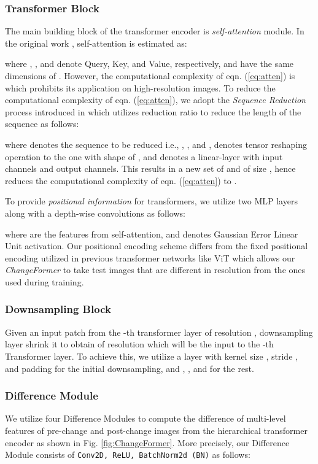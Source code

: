 \documentclass{article}
\def\ChangeFormer{{\textit{ChangeFormer}}}
\begin{document}
\subsubsection{Transformer Block} 
The main building block of the transformer encoder is \textit{self-attention} module. In the original work \cite{original_attention}, self-attention is estimated as:

where , , and  denote Query, Key, and Value, respectively, and have the same dimensions of . However, the computational complexity of eqn. (\ref{eq:atten}) is  which prohibits its application on high-resolution images. To reduce the computational complexity of eqn. (\ref{eq:atten}), we adopt the \textit{Sequence Reduction} process introduced in \cite{eff_atten} which utilizes reduction ratio  to reduce the length of the sequence  as follows:


where  denotes the sequence to be reduced i.e., , , and ,   denotes tensor reshaping operation to the one with
shape of ,  and  denotes a linear-layer with  input channels and  output channels. This results in a new set of  and  of size , hence reduces the computational complexity of eqn. (\ref{eq:atten}) to .

To provide \textit{positional information} for transformers, we utilize two MLP layers along with a  depth-wise convolutions as follows:

where  are the features from self-attention, and  denotes Gaussian Error Linear Unit activation. Our positional encoding scheme differs from the fixed positional encoding utilized in previous transformer networks like ViT \cite{vit} which allows our \ChangeFormer{} to take test images that are different in resolution from the ones used during training.


\subsubsection{Downsampling Block} 
Given an input patch  from the -th transformer layer of resolution , downsampling layer shrink it to obtain  of resolution  which will be the input to the -th Transformer layer. To achieve this, we utilize a   layer with  kernel size , stride , and padding  for the initial downsampling, and  , , and  for the rest.

\subsubsection{Difference Module} 
We utilize four Difference Modules to compute the difference of multi-level features of pre-change and post-change images from the hierarchical transformer encoder as shown in Fig. \ref{fig:ChangeFormer}. More precisely, our Difference Module consists of \texttt{Conv2D, ReLU, BatchNorm2d (BN)} as follows:
\end{document}
